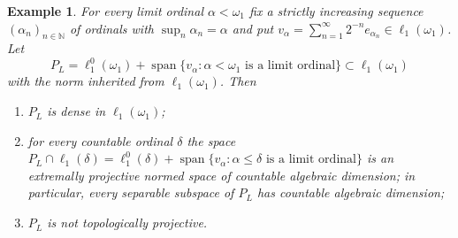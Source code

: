\documentclass[12pt]{article}
\newtheorem{example}[theorem]{Example}
\newcommand{\lo}[1]{\ell_1^0(#1)}
\newcommand{\ellone}[1]{\ell_1(#1)}
\newcommand{\Lin}{\operatorname{span}}
\begin{document}
\begin{example}\label{LadderSpace} For every limit ordinal $\alpha<\omega_1$
    fix a strictly increasing sequence ${(\alpha_n)}_{n\in\mathbb{N}}$ of
    ordinals with $\sup_n\alpha_n=\alpha$ and put
    $v_\alpha=\sum_{n=1}^\infty 2^{-n}e_{\alpha_n}\in\ellone{\omega_1}$. Let
    \[
    P_L=\lo{\omega_1}+\Lin\{v_\alpha:\alpha<\omega_1\text{ is a limit ordinal}\}
    \subset\ellone{\omega_1}
    \]
    with the norm inherited from $\ellone{\omega_1}$. Then
    \begin{enumerate}[label = (\roman*)]
        \item $P_L$ is dense in $\ellone{\omega_1}$;
        \item for every countable ordinal $\delta$ the space
              $P_L\cap\ellone{\delta}=\lo{\delta}+\Lin\{v_\alpha:\alpha\leq\delta
              \text{ is a limit ordinal}\}$ is an extremally projective normed
              space of countable algebraic dimension; in particular, every
              separable subspace of $P_L$ has countable algebraic dimension;
        \item $P_L$ is not topologically projective.
    \end{enumerate}
\end{example}
\end{document}
